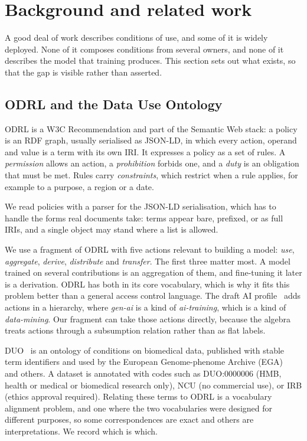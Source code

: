 \documentclass[sigconf,anonymous,review]{acmart}
\begin{document}
\section{Background and related work}
\label{sec:related}

A good deal of work describes conditions of use, and some of it is widely
deployed. None of it composes conditions from several owners, and none of it
describes the model that training produces. This section sets out what exists,
so that the gap is visible rather than asserted.

\subsection{ODRL and the Data Use Ontology}

ODRL is a W3C Recommendation and part of the Semantic Web stack: a policy is an
RDF graph, usually serialised as JSON-LD, in which every action, operand and
value is a term with its own IRI. It expresses a policy as a set of rules. A
\emph{permission} allows an action, a \emph{prohibition} forbids one, and a
\emph{duty} is an obligation that must be met. Rules carry \emph{constraints},
which restrict when a rule applies, for example to a purpose, a region or a date.

We read policies with a parser for the JSON-LD serialisation, which has to handle
the forms real documents take: terms appear bare, prefixed, or as full IRIs, and
a single object may stand where a list is allowed.

We use a fragment of ODRL with five actions relevant to building a model:
\emph{use}, \emph{aggregate}, \emph{derive}, \emph{distribute} and
\emph{transfer}. The first three matter most. A model trained on several
contributions is an aggregation of them, and fine-tuning it later is a
derivation. ODRL has both in its core vocabulary, which is why it fits this
problem better than a general access control language. The draft AI
profile~\cite{odrl-ai} adds actions in a hierarchy, where \emph{gen-ai} is a kind
of \emph{ai-training}, which is a kind of \emph{data-mining}. Our fragment can
take those actions directly, because the algebra treats actions through a
subsumption relation rather than as flat labels.

DUO~\cite{duo} is an ontology of conditions on biomedical data, published with
stable term identifiers and used by the European Genome-phenome Archive
(EGA)~\cite{ega} and others. A dataset is annotated with codes such as
DUO:0000006 (HMB, health or medical or biomedical research only), NCU (no
commercial use), or IRB (ethics approval required). Relating these terms to ODRL
is a vocabulary alignment problem, and one where the two vocabularies were
designed for different purposes, so some correspondences are exact and others are
interpretations. We record which is which.
\end{document}
